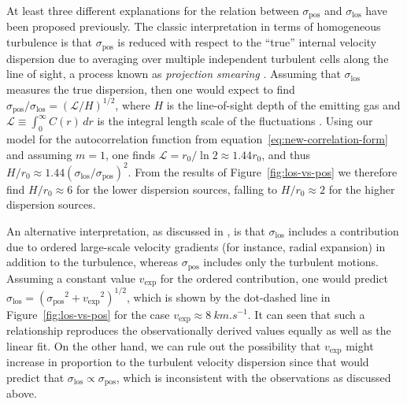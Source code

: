\documentclass[fleqn,usenatbib, useAMS, a4paper]{mnras}
\newcommand\pos{\ensuremath{_{\mathrm{pos}}}}
\newcommand\los{\ensuremath{_{\mathrm{los}}}}
\begin{document}

\newcommand\LL{\mathcal{L}}
At least three different explanations for the relation
between \(\sigma\pos\) and \(\sigma\los\) have been proposed previously.
The classic interpretation in terms of homogeneous turbulence
is that \(\sigma\pos\) is reduced with respect to the ``true''
internal velocity dispersion
due to averaging over multiple independent turbulent cells
along the line of sight,
a process known as \textit{projection smearing}
\citep{von1951methode, 1984ApJ...277..556S}.
Assuming that \(\sigma\los\) measures the true dispersion,
then one would expect to find \(\sigma\pos / \sigma\los = (\LL /H)^{1/2}\),
where \(H\) is the line-of-sight depth of the emitting gas
and \(\LL \equiv \int_0^\infty C(r)\, dr\) is the integral length scale of
the fluctuations \citep{Pope:2000p}.
Using our model for the autocorrelation function from
equation~\eqref{eq:new-correlation-form} and assuming \(m = 1\),
one finds \(\LL = r_0 / \ln 2 \approx 1.44 r_0\),
and thus \(H / r_0 \approx 1.44 (\sigma\los / \sigma\pos)^2\).
From the results of Figure~\ref{fig:los-vs-pos} we therefore find
\(H / r_0 \approx 6\) for the lower dispersion sources,
falling to \(H / r_0 \approx 2\) for the higher dispersion sources.

\newcommand\vexp{\ensuremath{v_{\text{exp}}}}
An alternative interpretation,
as discussed in \citet{2011MNRAS.413..705L},
is that \(\sigma\los\) includes a contribution due to
ordered large-scale velocity gradients
(for instance, radial expansion)
in addition to the turbulence,
whereas \(\sigma\pos\) includes only the turbulent motions. 
Assuming a constant value \vexp{} for the ordered contribution,
one would predict \(\sigma\los = (\sigma\pos^2 + \vexp^2)^{1/2}\),
which is shown by the dot-dashed line in Figure~\ref{fig:los-vs-pos}
for the case \(\vexp \approx \SI{8}{km.s^{-1}}\).
It can seen that such a relationship reproduces the 
observationally derived values equally as well as the linear fit.
On the other hand, we can rule out the possibility that
\vexp{} might increase in proportion to the turbulent velocity dispersion
since that would predict that \(\sigma\los \propto \sigma\pos\),
which is inconsistent with the observations as discussed above.
\end{document}

